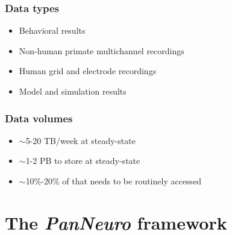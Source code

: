\documentclass[a0, landscape]{a0poster}
\begin{document}
\begin{multicols}{3}
\begin{minipage}[b]{0.45\linewidth}
\subsubsection*{Data types}
\begin{itemize}
\item Behavioral results
\item Non-human primate multichannel recordings
\item Human grid and electrode recordings
\item Model and simulation results
\end{itemize}
\end{minipage}
\hfill
\begin{minipage}[b]{0.45\linewidth}
\subsubsection*{Data volumes}
\begin{itemize}
\item $\sim$5-20 TB/week at steady-state
\item $\sim$1-2 PB to store at steady-state
\item $\sim$10\%-20\% of that needs to be routinely accessed
\end{itemize}
\end{minipage}

\vfill
\columnbreak

\color{Navy}

\section*{The \emph{PanNeuro} framework}


\end{multicols}
\end{document}
